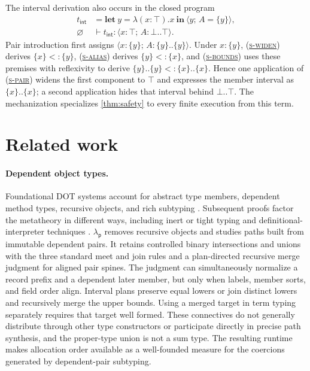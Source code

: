 \documentclass[acmsmall,screen,nonacm]{acmart}
\newcommand{\ruleref}[1]{%
  \textsc{(\hyperref[rule:#1]{#1})}}
\newcommand{\lambdap}{\ensuremath{\lambda_{\mathsf p}}}
\newcommand{\ctxempty}{\varnothing}
\newcommand{\sing}[1]{\{#1\}}
\newcommand{\pairty}[4]{\langle #1\!:\!#2;\,#3\!:\!#4\rangle}
\newcommand{\pairval}[3]{\langle #1;\,#2=#3\rangle}
\begin{document}
The interval derivation also occurs in the closed program
\[
\begin{aligned}
t_{\mathsf{int}}
  &={\mathbf{let}\ y=\lambda(x:\top).x\ \mathbf{in}\
      \pairval{y}{A}{\sing{y}}},
\\
\ctxempty&\vdash t_{\mathsf{int}}:
  \pairty{x}{\top}{A}{\bot..\top}.
\end{aligned}
\]
Pair introduction first assigns
\(\pairty{x}{\sing{y}}{A}{\sing{y}..\sing{y}}\). Under
\(x:\sing y\), \ruleref{s-widen} derives
\(\sing x<:\sing y\), \ruleref{s-alias} derives
\(\sing y<:\sing x\), and \ruleref{s-bounds} uses these premises with
reflexivity to derive
\(\sing y..\sing y<:\sing x..\sing x\). Hence one application of
\ruleref{s-pair} widens the first component to \(\top\) and expresses the
member interval as \(\sing{x}..\sing{x}\); a second application hides that
interval behind \(\bot..\top\). The mechanization specializes
\cref{thm:safety} to every finite execution from this term.

\section{Related work}
\label{sec:related}

\paragraph{Dependent object types.}
Foundational DOT systems account for abstract type members, dependent method
types, recursive objects, and rich subtyping
\citep{amin2014foundations,rompf2016dot}. Subsequent proofs factor the
metatheory in different ways, including inert or tight typing
\citep{rapoport2017simple} and definitional-interpreter techniques
\citep{amin2017definitional}. \lambdap{} removes recursive objects and studies
paths built from immutable dependent pairs. It retains controlled binary
intersections and unions with the three standard meet and join rules and a
plan-directed recursive merge judgment for aligned pair spines. The judgment
can simultaneously normalize a record prefix and a dependent later member,
but only when labels, member sorts, and field order align. Interval plans
preserve equal lowers or join distinct lowers and recursively merge the upper
bounds. Using a merged target in term typing separately requires that target
well formed. These connectives do not generally distribute through other type
constructors or participate directly in precise path synthesis, and the
proper-type union is not a sum type. The resulting runtime makes allocation
order available as a well-founded measure for the coercions generated by
dependent-pair subtyping.
\end{document}
